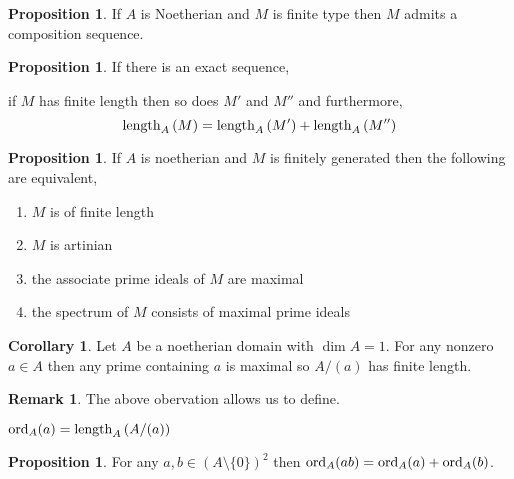 \documentclass[12pt]{extarticle}
\theoremstyle{definition}
\newtheorem{proposition}[theorem]{Proposition}
\newtheorem{corollary}[theorem]{Corollary}
\newtheorem{remark}{Remark}
\newenvironment{definition}[1][Definition:]{\begin{trivlist}
\item[\hskip \labelsep {\bfseries #1}]}{\end{trivlist}}
\begin{document}
\begin{proposition}
If $A$ is Noetherian and $M$ is finite type then $M$ admits a composition sequence. 
\end{proposition}

\begin{proposition}
If there is an exact sequence,
\begin{center}
\end{center}
if $M$ has finite length then so does $M'$ and $M''$ and furthermore,
\[ \mathrm{length}_{A}\left( M \right) = \mathrm{length}_{A}\left( M' \right) + \mathrm{length}_{A}\left( M'' \right) \]
\end{proposition}

\begin{proposition}
If $A$ is noetherian and $M$ is finitely generated then the following are equivalent,
\begin{center}
\begin{enumerate}
\item $M$ is of finite length
\item $M$ is artinian
\item the associate prime ideals of $M$ are maximal
\item the spectrum of $M$ consists of maximal prime ideals
\end{enumerate}
\end{center}
\end{proposition}

\begin{corollary}
Let $A$ be a noetherian domain with $\dim{A} = 1$. For any nonzero $a \in A$ then any prime containing $a$ is maximal so $A / (a)$ has finite length. 
\end{corollary}

\begin{remark}
The above obervation allows us to define.
\end{remark}

\begin{definition}
$\mathrm{ord}_A(a) = \mathrm{length}_{A}\left( A / (a) \right)$
\end{definition}

\begin{proposition}
For any $a,b \in (A \setminus \{ 0 \})^2$ then $\mathrm{ord}_A(ab) = \mathrm{ord}_A(a) + \mathrm{ord}_A(b)$.
\end{proposition}
\end{document}
